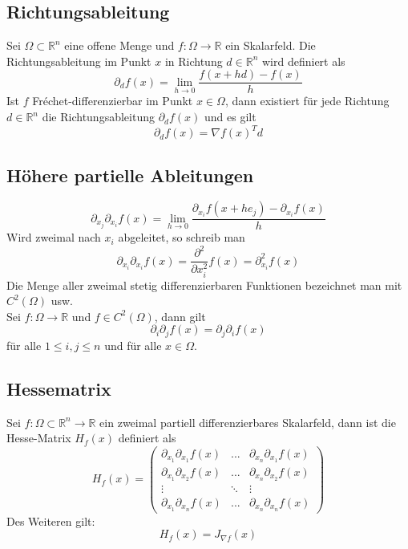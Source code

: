 \documentclass[a4paper,twocolumn,10pt]{article}
\begin{document}
\subsection{Richtungsableitung}
Sei $\Omega\subset\mathbb{R}^n$ eine offene Menge und $f:\Omega\rightarrow\mathbb{R}$ ein Skalarfeld. Die Richtungsableitung im Punkt $x$ in Richtung $d\in\mathbb{R}^n$ wird definiert als
\begin{equation*}
\partial_d f(x)=\lim\limits_{h\rightarrow 0}\frac{f(x+hd)-f(x)}{h}
\end{equation*}
Ist $f$ Fréchet-differenzierbar im Punkt $x\in\Omega$, dann existiert für jede Richtung $d\in\mathbb{R}^n$ die Richtungsableitung $\partial_d f(x)$ und es gilt
\begin{equation*}
\partial_d f(x)=\nabla f(x)^T d
\end{equation*}

\subsection{Höhere partielle Ableitungen}
\begin{equation*}
\partial_{x_j}\partial_{x_i}f(x)=\lim\limits_{h\rightarrow 0}\frac{\partial_{x_i}f(x+he_j)-\partial_{x_i}f(x)}{h}
\end{equation*}
Wird zweimal nach $x_i$ abgeleitet, so schreib man
\begin{equation*}
\partial_{x_i}\partial_{x_i}f(x)=\frac{\partial^2}{\partial x_i^2}f(x)=\partial_{x_i}^2 f(x)
\end{equation*}
Die Menge aller zweimal stetig differenzierbaren Funktionen bezeichnet man mit $C^2(\Omega)$ usw.\\
Sei $f:\Omega\rightarrow\mathbb{R}$ und $f\in C^2(\Omega)$, dann gilt
\begin{equation*}
\partial_i \partial_j f(x)=\partial_j \partial_i f(x)
\end{equation*}
für alle $1\leq i,j\leq n$ und für alle $x\in\Omega$.

\subsection{Hessematrix}
Sei $f:\Omega\subset\mathbb{R}^n\rightarrow\mathbb{R}$ ein zweimal partiell differenzierbares Skalarfeld, dann ist die Hesse-Matrix $H_f(x)$ definiert als
\begin{equation*}
H_f(x)=\begin{pmatrix}\partial_{x_1}\partial_{x_1}f(x) & ... & \partial_{x_n}\partial_{x_1}f(x) \\ \partial_{x_1}\partial_{x_2}f(x) & ... & \partial_{x_n}\partial_{x_2}f(x) \\ \vdots & \ddots & \vdots \\ \partial_{x_1}\partial_{x_n}f(x) & ... & \partial_{x_n}\partial_{x_n}f(x)\end{pmatrix}
\end{equation*}
Des Weiteren gilt:
\begin{equation*}
H_f(x)=J_{\nabla f}(x)
\end{equation*}
\end{document}
